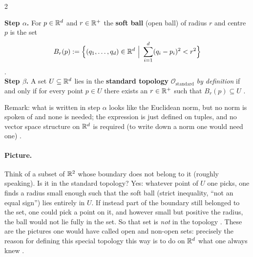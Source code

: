\begin{paracol}{2}
\begin{definition}\label{def:c01-standard}
\textbf{Step $\alpha$.} For $p\in\mathbb{R}^d$ and $r\in\mathbb{R}^+$ the \textbf{soft ball} (open ball) of radius $r$ and centre $p$ is the set
\[
  B_r(p):=\Bigl\{(q_1,\dots,q_d)\in\R^d\ \Big|\ \sum_{i=1}^{d}(q_i-p_i)^2<r^2\Bigr\}
\]
.\\
\textbf{Step $\beta$.} A set $U\subseteq\mathbb{R}^d$ lies in the \textbf{standard topology} $\mathcal O_{\mathrm{standard}}$ \emph{by definition}
if and only if for every point $p\in U$ there exists an $r\in\mathbb{R}^+$ such that $B_r(p)\subseteq U$
.
\end{definition}
Remark: what is written in step $\alpha$ looks like the Euclidean norm, but no norm is spoken of and none is needed; the
expression is just defined on tuples, and no vector space structure on $\mathbb{R}^d$ is required (to write down a norm one would need
one) .

\paragraph{Picture.} Think of a subset of $\mathbb{R}^2$ whose boundary does not belong to it (roughly speaking). Is it in the standard
topology? Yes: whatever point of $U$ one picks, one finds a radius small enough such that the soft ball (strict inequality, ``not an
equal sign'') lies entirely in $U$. If instead part of the boundary still belonged to the set, one could pick a point on it, and
however small but positive the radius, the ball would not lie fully in the set. So that set is \emph{not} in the topology
. These are the pictures one would have called
open and non-open sets: precisely the reason for defining this special topology this way is to do on $\mathbb{R}^d$ what one always knew
.


\end{paracol}
